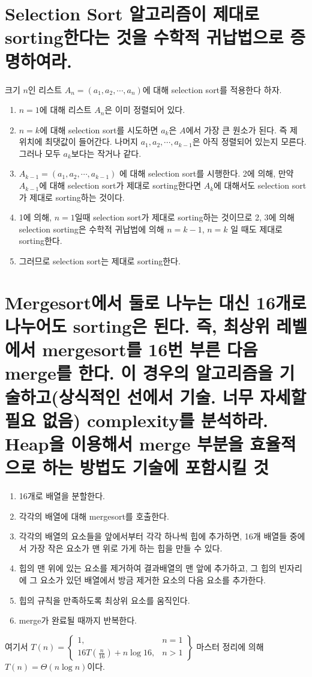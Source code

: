 \documentclass{article}
\begin{document}
\section{Selection Sort 알고리즘이 제대로 sorting한다는 것을 수학적 귀납법으로 증명하여라.}
크기 $n$인 리스트 $A_n=(a_1, a_2, \cdots, a_n)$에 대해 selection sort를 적용한다 하자.
\begin{enumerate}
	\item $n=1$에 대해 리스트 $A_n$은 이미 정렬되어 있다. 
	\item $n=k$에 대해 selection sort를 시도하면 $a_k$은 $A$에서 가장 큰 원소가 된다. 즉 제 위치에 최댓값이 들어간다. 나머지 $a_1, a_2, \cdots, a_{k-1}$은 아직 정렬되어 있는지 모른다. 그러나 모두 $a_k$보다는 작거나 같다. 
	\item $A_{k-1}=(a_1, a_2, \cdots, a_{k-1})$ 에 대해 selection sort를 시행한다. 2에 의해, 만약 $A_{k-1}$에 대해 selection sort가 제대로 sorting한다면 $A_k$에 대해서도 selection sort가 제대로 sorting하는 것이다.
	\item 1에 의해, $n=1$일때 selection sort가 제대로 sorting하는 것이므로 2, 3에 의해 selection sorting은 수학적 귀납법에 의해 $n=k-1$, $n=k$ 일 때도 제대로 sorting한다.
	\item 그러므로 selection sort는 제대로 sorting한다.   
\end{enumerate}
\section{Mergesort에서 둘로 나누는 대신 16개로 나누어도 sorting은 된다. 즉, 최상위 레벨에서 mergesort를 16번 부른 다음 merge를 한다. 이 경우의 알고리즘을 기술하고(상식적인 선에서 기술. 너무 자세할 필요 없음) complexity를 분석하라. Heap을 이용해서 merge 부분을 효율적으로 하는 방법도 기술에 포함시킬 것}
\begin{enumerate}
    \item 16개로 배열을 분할한다.
    \item 각각의 배열에 대해 mergesort를 호출한다.
    \item 각각의 배열의 요소들을 앞에서부터 각각 하나씩 힙에 추가하면, 16개 배열들 중에서 가장 작은 요소가 맨 위로 가게 하는 힙을 만들 수 있다.
    \item 힙의 맨 위에 있는 요소를 제거하여 결과배열의 맨 앞에 추가하고, 그 힙의 빈자리에 그 요소가 있던 배열에서 방금 제거한 요소의 다음 요소를 추가한다.
    \item 힙의 규칙을 만족하도록 최상위 요소를 움직인다.
    \item merge가 완료될 때까지 반복한다.
\end{enumerate}
여기서
$
T(n) = \left\{\begin{array}{lr}
    1, &  n = 1\\
    16T(\frac n{16})+ n\log16, &  n > 1
    \end{array}\right\}
$
마스터 정리에 의해 $T(n) = \Theta(n \log n)$이다.
\end{document}
